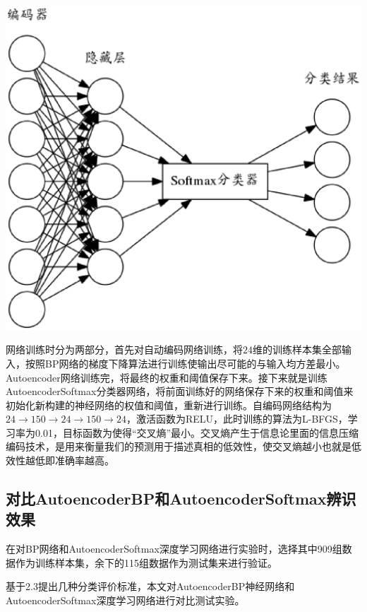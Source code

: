 \documentclass{ctacn}%
\begin{document}
\begin{multicols}{2}
\begin{center}
	\includegraphics[scale=0.12, trim=0 0 0 0]{figs/autoencoder_softmax}\\
	\label{fig4}
\end{center}

网络训练时分为两部分，首先对自动编码网络训练，将$24$维的训练样本集全部输入，按照BP网络的梯度下降算法进行训练使输出尽可能的与输入均方差最小。Autoencoder网络训练完，将最终的权重和阈值保存下来。接下来就是训练AutoencoderSoftmax分类器网络，将前面训练好的网络保存下来的权重和阈值来初始化新构建的神经网络的权值和阈值，重新进行训练。自编码网络结构为$24\rightarrow150\rightarrow24\rightarrow150\rightarrow24$，激活函数为RELU，此时训练的算法为L-BFGS，学习率为0.01，目标函数为使得“交叉熵”最小。交叉熵产生于信息论里面的信息压缩编码技术，是用来衡量我们的预测用于描述真相的低效性，使交叉熵越小也就是低效性越低即准确率越高。

\subsection{对比AutoencoderBP和AutoencoderSoftmax辨识效果}

在对BP网络和AutoencoderSoftmax深度学习网络进行实验时，选择其中909组数据作为训练样本集，余下的115组数据作为测试集来进行验证。

基于2.3提出几种分类评价标准，本文对AutoencoderBP神经网络和AutoencoderSoftmax深度学习网络进行对比测试实验。


\end{multicols}
\end{document}
